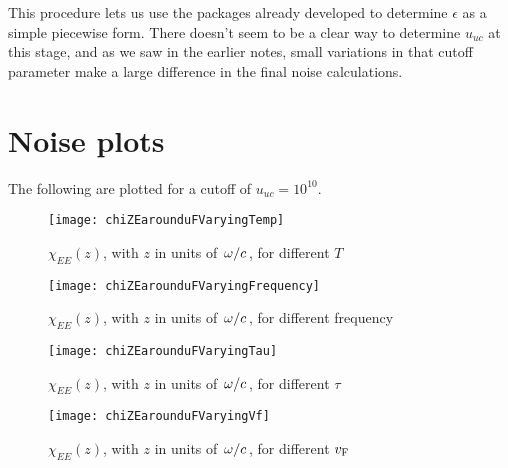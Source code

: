 \documentclass[../main.tex]{subfiles}
\begin{document}
	This procedure lets us use the packages already developed to determine $\epsilon$ as a simple piecewise form.
	There doesn't seem to be a clear way to determine $u_{uc}$ at this stage, and as we saw in the earlier notes, small variations in that cutoff parameter make a large difference in the final noise calculations.

	\section{Noise plots} \label{sec:plotsine}

	The following are plotted for a cutoff of $u_{uc} = 10^{10}$.

	\begin{figure}[htp]
		\centering
		\texttt{[image: chiZEarounduFVaryingTemp]}
		\caption{$\chi_{EE}(z)$, with $z$ in units of $\flatfrac{\omega}{c}$, for different $T$} \label{fig:ine:temp}
	\end{figure}

	\begin{figure}[htp]
		\centering
		\texttt{[image: chiZEarounduFVaryingFrequency]}
		\caption{$\chi_{EE}(z)$, with $z$ in units of $\flatfrac{\omega}{c}$, for different frequency} \label{fig:ine:frequency}
	\end{figure}

	\begin{figure}[htp]
		\centering
		\texttt{[image: chiZEarounduFVaryingTau]}
		\caption{$\chi_{EE}(z)$, with $z$ in units of $\flatfrac{\omega}{c}$, for different $\tau$} \label{fig:ine:tau}
	\end{figure}

	\begin{figure}[htp]
		\centering
		\texttt{[image: chiZEarounduFVaryingVf]}
		\caption{$\chi_{EE}(z)$, with $z$ in units of $\flatfrac{\omega}{c}$, for different $v_{\mathrm{F}}$} \label{fig:ine:vf}
	\end{figure}
\end{document}

